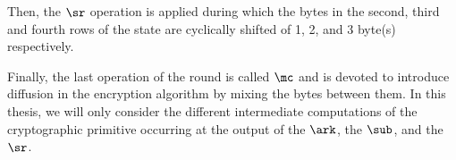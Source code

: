 Then, the \(\sr\) operation is applied during which the bytes in the second, third and fourth rows of the state are cyclically shifted of 1, 2, and 3 byte(s) respectively.

Finally, the last operation of the round is called \(\mc\) and is devoted to introduce \gls{diffusion} in the encryption algorithm by mixing the bytes between them.
In this thesis, we will only consider the different intermediate computations of the cryptographic primitive occurring at the output of the \(\ark\), the \(\sub\), and the \(\sr\).